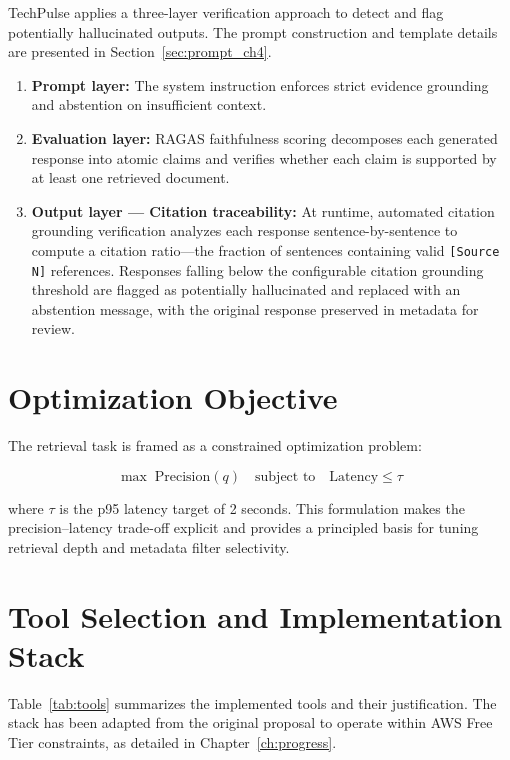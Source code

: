 TechPulse applies a three-layer verification approach to detect and flag potentially hallucinated outputs. The prompt construction and template details are presented in Section~\ref{sec:prompt_ch4}.

\begin{enumerate}[leftmargin=0.5in]
  \item \textbf{Prompt layer:} The system instruction enforces strict evidence grounding and abstention on insufficient context.

  \item \textbf{Evaluation layer:} RAGAS faithfulness scoring decomposes each generated response into atomic claims and verifies whether each claim is supported by at least one retrieved document.

  \item \textbf{Output layer --- Citation traceability:} At runtime, automated citation grounding verification analyzes each response sentence-by-sentence to compute a citation ratio---the fraction of sentences containing valid \texttt{[Source N]} references. Responses falling below the configurable citation grounding threshold are flagged as potentially hallucinated and replaced with an abstention message, with the original response preserved in metadata for review.
\end{enumerate}

\section{Optimization Objective}
\label{sec:optimization}

The retrieval task is framed as a constrained optimization problem:

\begin{equation}
  \max \; \text{Precision}(q) \quad \text{subject to} \quad \text{Latency} \leq \tau
  \label{eq:opt}
\end{equation}

where $\tau$ is the p95 latency target of 2 seconds. This formulation makes the precision--latency trade-off explicit and provides a principled basis for tuning retrieval depth and metadata filter selectivity.

\section{Tool Selection and Implementation Stack}
\label{sec:tools}

Table~\ref{tab:tools} summarizes the implemented tools and their justification. The stack has been adapted from the original proposal to operate within AWS Free Tier constraints, as detailed in Chapter~\ref{ch:progress}.

